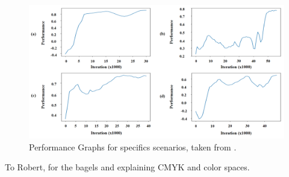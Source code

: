 \documentclass[sigconf]{acmart}
\begin{document}
\begin{figure}[h]
  \centering
  \includegraphics[width=1\linewidth]{images/aiPerformance.png}
  \caption{Performance Graphs for specifics scenarios, taken from \cite{lee_crowd_2018}.
  }
  \label{fig:aiPerformance}
\end{figure}



\begin{acks}
To Robert, for the bagels and explaining CMYK and color spaces.
\end{acks}




\appendix
\end{document}
